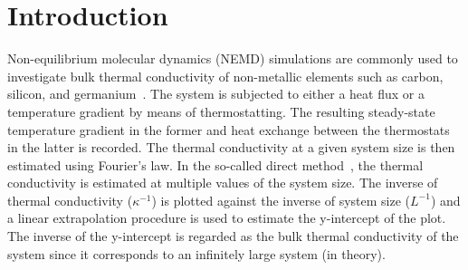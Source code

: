 \section{Introduction}
\label{sec:intro}


Non-equilibrium molecular dynamics (NEMD) simulations are commonly used to investigate
bulk thermal conductivity of non-metallic elements such as carbon, silicon, and
germanium~\cite{Dumitrica:2010}. The system is subjected to either a heat flux or a temperature
gradient by means of thermostatting. The resulting steady-state temperature gradient in the
former and heat exchange between the thermostats in the latter is recorded. The thermal
conductivity at a given system size is then estimated using Fourier's law. In the
so-called direct method~\cite{Schelling:2002,Turney:2009,Zhou:2009,Landry:2009,
McGaughey:2006,Ni:2009,Shi:2009,Wang:2009,Papanikolaou:2008},
the thermal conductivity is estimated at multiple values of the
system size. The inverse of thermal conductivity ($\kappa^{-1}$) is plotted against the inverse of 
system size ($L^{-1}$) and a linear extrapolation procedure is used to estimate the y-intercept
of the plot. The inverse of the y-intercept is regarded as the bulk thermal conductivity
of the system since it corresponds to an infinitely large system (in theory). 

